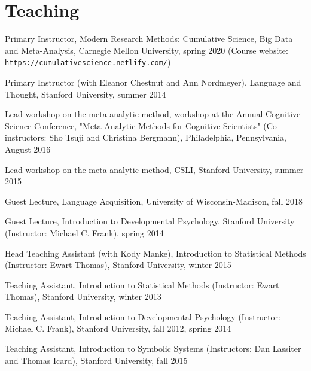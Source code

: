 \documentclass[letterpaper]{article}
\renewenvironment{itemize}{
  \begin{list}{}{
    \setlength{\leftmargin}{1.5em}
  }
}{
  \end{list}
}
\begin{document}
\section*{Teaching}
\begin{itemize}
\item Primary Instructor, Modern Research Methods: Cumulative Science, Big Data and Meta-Analysis, Carnegie Mellon University, spring 2020 (Course website: \href{https://cumulativescience.netlify.com/}{\tt https://cumulativescience.netlify.com/})
\item  Primary Instructor (with Eleanor Chestnut and Ann Nordmeyer), Language and Thought, Stanford University, summer 2014
\item Lead workshop on the meta-analytic method, workshop at the Annual Cognitive Science Conference, "Meta-Analytic Methods for Cognitive Scientists" (Co-instructors: Sho Tsuji and Christina Bergmann), Philadelphia, Pennsylvania, August 2016
\item  Lead workshop on the meta-analytic method, CSLI, Stanford University, summer 2015
\item  Guest Lecture, Language Acquisition, University of Wisconsin-Madison, fall 2018
\item Guest Lecture, Introduction to Developmental Psychology, Stanford University (Instructor: Michael C. Frank), spring 2014
\item Head Teaching Assistant (with Kody Manke), Introduction to Statistical Methods (Instructor: Ewart Thomas), Stanford University, winter 2015

\item  Teaching Assistant,  Introduction to Statistical Methods (Instructor: Ewart Thomas), Stanford University, winter 2013
\item Teaching Assistant, Introduction to Developmental Psychology (Instructor: Michael C. Frank), Stanford University, fall 2012, spring 2014
\item Teaching Assistant, Introduction to Symbolic Systems (Instructors: Dan Lassiter and Thomas Icard), Stanford University, fall 2015


\end{itemize}
\end{document}
